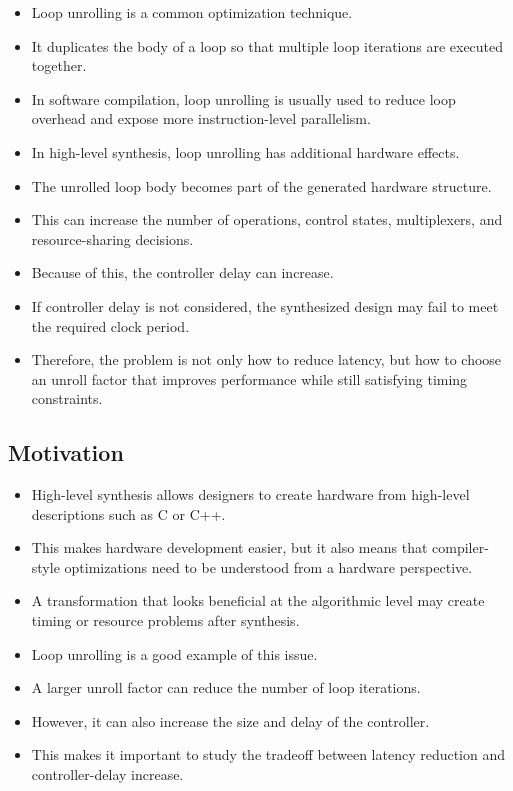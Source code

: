 \documentclass[conference]{IEEEtran}
\begin{document}
\begin{itemize}
    \item Loop unrolling is a common optimization technique.
    \item It duplicates the body of a loop so that multiple loop iterations are executed together.
    \item In software compilation, loop unrolling is usually used to reduce loop overhead and expose more instruction-level parallelism.
    \item In high-level synthesis, loop unrolling has additional hardware effects.
    \item The unrolled loop body becomes part of the generated hardware structure.
    \item This can increase the number of operations, control states, multiplexers, and resource-sharing decisions.
    \item Because of this, the controller delay can increase.
    \item If controller delay is not considered, the synthesized design may fail to meet the required clock period.
    \item Therefore, the problem is not only how to reduce latency, but how to choose an unroll factor that improves performance while still satisfying timing constraints.
\end{itemize}

\subsection{Motivation}

\begin{itemize}
    \item High-level synthesis allows designers to create hardware from high-level descriptions such as C or C++.
    \item This makes hardware development easier, but it also means that compiler-style optimizations need to be understood from a hardware perspective.
    \item A transformation that looks beneficial at the algorithmic level may create timing or resource problems after synthesis.
    \item Loop unrolling is a good example of this issue.
    \item A larger unroll factor can reduce the number of loop iterations.
    \item However, it can also increase the size and delay of the controller.
    \item This makes it important to study the tradeoff between latency reduction and controller-delay increase.
\end{itemize}
\end{document}
